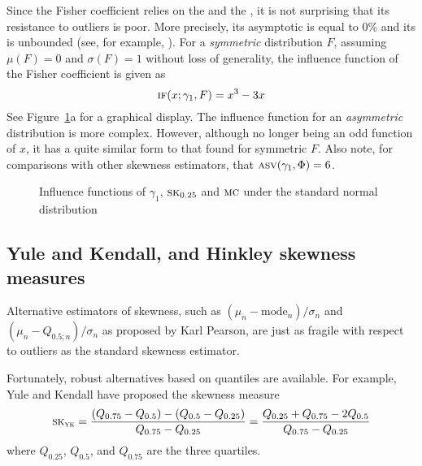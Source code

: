 Since the Fisher coefficient relies on the  and the , it is not surprising that its resistance to outliers is poor. More
precisely, its asymptotic  is equal to 0\% and its
 is unbounded (see, for example,
\citealp{groeneveld:1991}). For a \emph{symmetric} distribution $F$, assuming $\mu(F)
= 0$ and $\sigma(F) = 1$ without loss of generality, the influence function of  
the Fisher coefficient is given as
\[
    \stsc{IF}(x; \gamma_1, F) = x^{3} - 3x
\]
See Figure~\ref{fig:stat:IF_skew}a for a graphical display. The influence
function for an \emph{asymmetric} distribution is more complex. However,
although no longer being an odd function of $x$, it has a quite similar form to
that found for symmetric $F$. Also note, for comparisons with other skewness
estimators, that $\stsc{ASV}(\gamma_1, \Phi) = 6$.                            



\begin{figure}[h!]
    \centering
    \caption{Influence functions of $\gamma_1$, $\stsc{SK}_{0.25}$ and $\stsc{MC}$ under the standard normal distribution}
    \label{fig:stat:IF_skew}
\end{figure}

\subsection{Yule and Kendall, and Hinkley skewness measures}

Alternative estimators of skewness, such as $(\mu_n-\text{mode}_n)/\sigma_n$ 
and $(\mu_n-Q_{0.5;n})/\sigma_n$ as proposed by Karl Pearson,
are just as fragile with respect to outliers as the standard
skewness estimator. 

Fortunately, robust alternatives based on quantiles are
available. For example, Yule and Kendall have proposed the skewness measure     
\[
    \stsc{SK}_{\stsc{YK}}
    = \frac{(Q_{0.75} - Q_{0.5}) - (Q_{0.5}-Q_{0.25})}{Q_{0.75} - Q_{0.25}}
    = \frac{Q_{0.25} + Q_{0.75} - 2Q_{0.5}}{Q_{0.75} - Q_{0.25}}
\]
where $Q_{0.25}$, $Q_{0.5}$, and $Q_{0.75}$ are the three quartiles.

